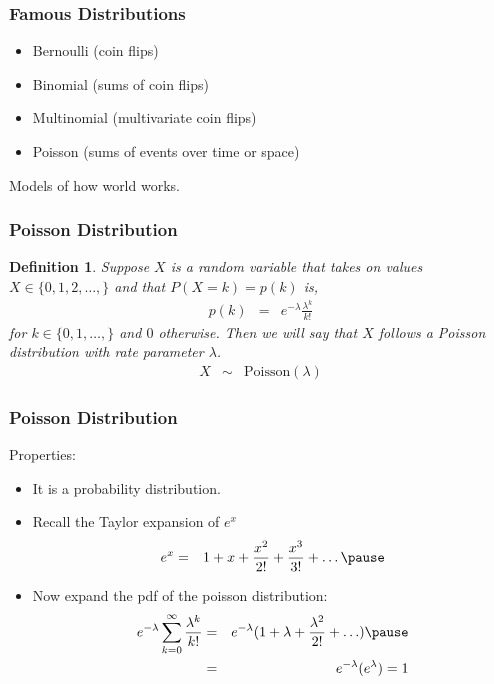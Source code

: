 \documentclass[handout]{beamer}
\newtheorem{defn}{Definition}
\numberwithin{equation}{section}
\begin{document}
\begin{frame}
\frametitle{Famous Distributions}

\begin{itemize}
\item[-] Bernoulli (coin flips)
\item[-] Binomial (sums of coin flips)
\item[-] Multinomial (multivariate coin flips)
\item[-] Poisson (sums of events over time or space)
\end{itemize}

\alert{Models} of how world works.  


\end{frame}



\begin{frame}
\frametitle{Poisson Distribution}

\begin{defn}
Suppose $X$ is a random variable that takes on values $X \in \{0, 1, 2, \hdots, \}$ and that $P(X = k) = p(k)$ is,
\begin{eqnarray}
p(k) & = & e^{-\lambda} \frac{\lambda^{k}}{k!} \nonumber 
\end{eqnarray}
for $k \in \{0, 1, \hdots, \}$ and $0$ otherwise.  Then we will say that $X$ follows a \alert{Poisson} distribution with \alert{rate} parameter $\lambda$.  \\
\begin{eqnarray}
X & \sim & \text{Poisson}(\lambda) \nonumber 
\end{eqnarray}

\end{defn}




\end{frame}






\begin{frame}
\frametitle{Poisson Distribution}
Properties:
\begin{itemize}
\item[1)] It is a probability distribution. \\
\item Recall the \alert{Taylor expansion} of $e^{x}$
\begin{eqnarray}
e^{x} & = & 1 + x + \frac{x^{2}}{2!} + \frac{x^3}{3!} + \hdots \nonumber \pause 
\end{eqnarray}
\item Now expand the pdf of the poisson distribution:
\begin{eqnarray}
e^{-\lambda} \sum_{k=0}^{\infty} \frac{\lambda^{k} }{k!} & = & e^{-\lambda}(1 + \lambda  + \frac{\lambda^2}{2!} + \hdots ) \nonumber  \pause\\
 & = & e^{-\lambda} (e^{\lambda}) = 1 \nonumber 
\end{eqnarray}
\end{itemize}

\end{frame}
\end{document}
